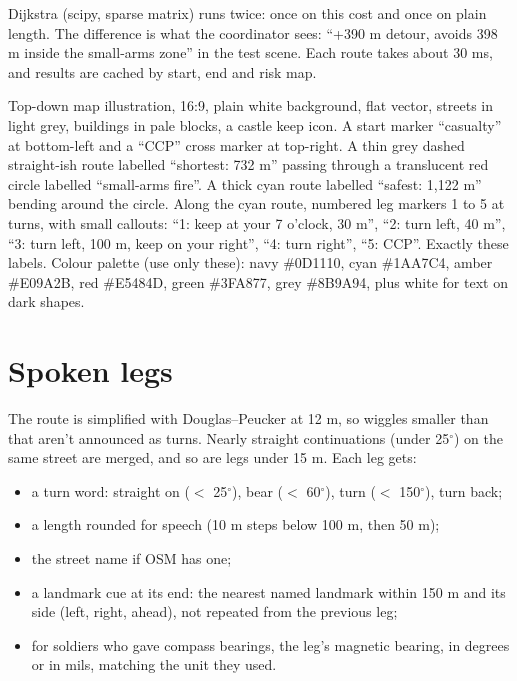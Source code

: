 Dijkstra (scipy, sparse matrix) runs twice: once on this cost and once on plain length. The difference is what
the coordinator sees: ``+390 m detour, avoids 398 m inside the small-arms zone'' in the test scene. Each route
takes about 30 ms, and results are cached by start, end and risk map.

{Top-down map illustration, 16:9, plain white background, flat vector, streets in light grey, buildings in pale blocks, a castle
keep icon. A start marker ``casualty'' at bottom-left and a ``CCP'' cross marker at top-right. A thin grey dashed straight-ish
route labelled ``shortest: 732 m'' passing through a translucent red circle labelled ``small-arms fire''. A thick cyan route
labelled ``safest: 1,122 m'' bending around the circle. Along the cyan route, numbered leg markers 1 to 5 at turns, with
small callouts: ``1: keep at your 7 o'clock, 30 m'', ``2: turn left, 40 m'', ``3: turn left, 100 m, keep on your right'',
``4: turn right'', ``5: CCP''. Exactly these labels. Colour palette (use only these): navy \#0D1110, cyan \#1AA7C4, amber \#E09A2B, red \#E5484D, green \#3FA877, grey \#8B9A94, plus white for text on dark shapes.}

\section{Spoken legs}

The route is simplified with Douglas--Peucker at 12 m, so wiggles smaller than that aren't announced as turns.
Nearly straight continuations (under 25$^\circ$) on the same street are merged, and so are legs under 15 m. Each leg
gets:
\begin{itemize}
  \item a turn word: straight on ($<$ 25$^\circ$), bear ($<$ 60$^\circ$), turn ($<$ 150$^\circ$), turn back;
  \item a length rounded for speech (10 m steps below 100 m, then 50 m);
  \item the street name if OSM has one;
  \item a landmark cue at its end: the nearest named landmark within 150 m and its side (left, right, ahead), not
        repeated from the previous leg;
  \item for soldiers who gave compass bearings, the leg's magnetic bearing, in degrees or in mils, matching the unit they used.
\end{itemize}

